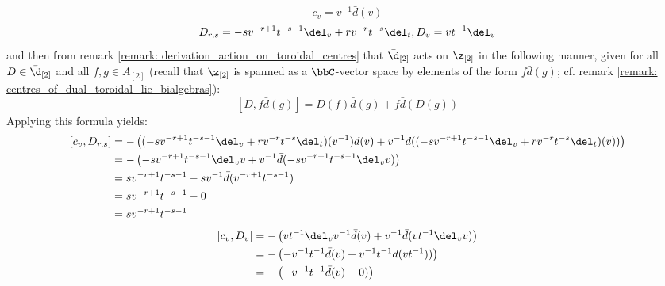 \begin{enumerate}
                                $$c_v = v^{-1} \bar{d}(v)$$
                                $$D_{r, s} = -s v^{-r + 1} t^{-s - 1} \del_v + r v^{-r} t^{-s} \del_t, D_v = vt^{-1} \del_v$$
                            and then from remark \ref{remark: derivation_action_on_toroidal_centres} that $\bar{\d}_{[2]}$ acts on $\z_{[2]}$ in the following manner, given for all $D \in \bar{\d}_{[2]}$ and all $f, g \in A_{[2]}$ (recall that $\z_{[2]}$ is spanned as a $\bbC$-vector space by elements of the form $f \bar{d}(g)$; cf. remark \ref{remark: centres_of_dual_toroidal_lie_bialgebras}):
                                $$[D, f \bar{d}(g)] = D(f) \bar{d}(g) + f \bar{d}( D(g) )$$
                            Applying this formula yields:
                                $$
                                    \begin{aligned}
                                        [c_v, D_{r, s}] & = -\left( (-s v^{-r + 1} t^{-s - 1} \del_v + r v^{-r} t^{-s} \del_t)(v^{-1}) \bar{d}(v) + v^{-1} \bar{d}( (-s v^{-r + 1} t^{-s - 1} \del_v + r v^{-r} t^{-s} \del_t)(v) ) \right)
                                        \\
                                        & = -\left( -s v^{-r + 1} t^{-s - 1} \del_v v + v^{-1} \bar{d}( -s v^{-r + 1} t^{-s - 1} \del_v v ) \right)
                                        \\
                                        & = s v^{-r + 1} t^{-s - 1} - s v^{-1} \bar{d}( v^{-r + 1} t^{-s - 1} )
                                        \\
                                        & = s v^{-r + 1} t^{-s - 1} - 0
                                        \\
                                        & = s v^{-r + 1} t^{-s - 1}
                                    \end{aligned}
                                $$
                                $$
                                    \begin{aligned}
                                        [c_v, D_v] & = -\left( v t^{-1} \del_v v^{-1} \bar{d}(v) + v^{-1} \bar{d}(v t^{-1} \del_v v)\right)
                                        \\
                                        & = -\left( - v^{-1} t^{-1} \bar{d}(v) + v^{-1} t^{-1} d(v t^{-1}) ) \right)
                                        \\
                                        & = -\left( - v^{-1} t^{-1} \bar{d}(v) + 0 ) \right)
                                        \\

\end{aligned}$$
\end{enumerate}
